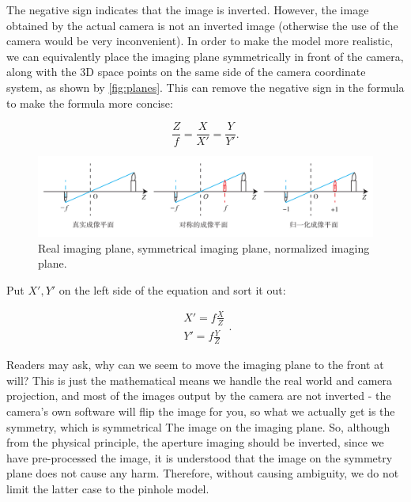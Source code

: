 The negative sign indicates that the image is inverted. However, the image obtained by the actual camera is not an inverted image (otherwise the use of the camera would be very inconvenient). In order to make the model more realistic, we can equivalently place the imaging plane symmetrically in front of the camera, along with the 3D space points on the same side of the camera coordinate system, as shown by \autoref{fig:planes}. This can remove the negative sign in the formula to make the formula more concise:

\begin{equation}
\frac{Z}{f} = \frac{X}{{X'}} =\frac{Y}{{Y'}}.
\end{equation}

\begin{figure}[!htp]
	\centering
	\includegraphics[width=1.0\textwidth]{chapter05/resources/cameraModel/planes.pdf}
	\caption{Real imaging plane, symmetrical imaging plane, normalized imaging plane.}
	\label{fig:planes}
\end{figure}

Put $X', Y'$ on the left side of the equation and sort it out:

\begin{equation}\label{eq:P2Pprime}
\begin{array}{l}
X' = f\frac{X}{Z}\\
Y' = f\frac{Y}{Z}
\end{array}.
\end{equation}

Readers may ask, why can we seem to move the imaging plane to the front at will? This is just the mathematical means we handle the real world and camera projection, and most of the images output by the camera are not inverted - the camera's own software will flip the image for you, so what we actually get is the symmetry, which is symmetrical The image on the imaging plane. So, although from the physical principle, the aperture imaging should be inverted, since we have pre-processed the image, it is understood that the image on the symmetry plane does not cause any harm. Therefore, without causing ambiguity, we do not limit the latter case to the pinhole model.

